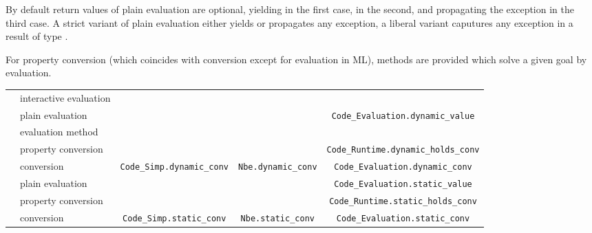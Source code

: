 \begin{isabellebody}
\begin{isamarkuptext}
  By default return values of plain evaluation are optional, yielding
   in the first case,  in the
  second, and propagating the exception in the third case.  A strict
  variant of plain evaluation either yields  or propagates
  any exception, a liberal variant caputures any exception in a result
  of type .
  
  For property conversion (which coincides with conversion except for
  evaluation in ML), methods are provided which solve a given goal by
  evaluation.%
\end{isamarkuptext}%
\isamarkuptrue%
%
\isamarkuptrue%
%
\begin{isamarkuptext}%
\newcommand{\ttsize}{\fontsize{5.8pt}{8pt}\selectfont}
  \fontsize{9pt}{12pt}\selectfont
  \begin{tabular}{ll||c|c|c}
    & & \isa{simp} & \isa{nbe} & \isa{code} \tabularnewline \hline \hline
    \multirow{5}{1ex}{\rotatebox{90}{dynamic}}
      & interactive evaluation 
      & \hyperlink{command.value}{\mbox{\isa{\isacommand{value}}}} \isa{{\isaliteral{5B}{\isacharbrackleft}}simp{\isaliteral{5D}{\isacharbrackright}}} & \hyperlink{command.value}{\mbox{\isa{\isacommand{value}}}} \isa{{\isaliteral{5B}{\isacharbrackleft}}nbe{\isaliteral{5D}{\isacharbrackright}}} & \hyperlink{command.value}{\mbox{\isa{\isacommand{value}}}} \isa{{\isaliteral{5B}{\isacharbrackleft}}code{\isaliteral{5D}{\isacharbrackright}}}
      \tabularnewline
    & plain evaluation & & & \ttsize\verb|Code_Evaluation.dynamic_value| \tabularnewline \cline{2-5}
    & evaluation method & \hyperlink{method.code-simp}{\mbox{\isa{code{\isaliteral{5F}{\isacharunderscore}}simp}}} & \hyperlink{method.normalization}{\mbox{\isa{normalization}}} & \hyperlink{method.eval}{\mbox{\isa{eval}}} \tabularnewline
    & property conversion & & & \ttsize\verb|Code_Runtime.dynamic_holds_conv| \tabularnewline \cline{2-5}
    & conversion & \ttsize\verb|Code_Simp.dynamic_conv| & \ttsize\verb|Nbe.dynamic_conv|
      & \ttsize\verb|Code_Evaluation.dynamic_conv| \tabularnewline \hline \hline
    \multirow{3}{1ex}{\rotatebox{90}{static}}
    & plain evaluation & & & \ttsize\verb|Code_Evaluation.static_value| \tabularnewline \cline{2-5}
    & property conversion & &
      & \ttsize\verb|Code_Runtime.static_holds_conv| \tabularnewline \cline{2-5}
    & conversion & \ttsize\verb|Code_Simp.static_conv|
      & \ttsize\verb|Nbe.static_conv|
      & \ttsize\verb|Code_Evaluation.static_conv|

\end{tabular}
\end{isamarkuptext}
\end{isabellebody}
